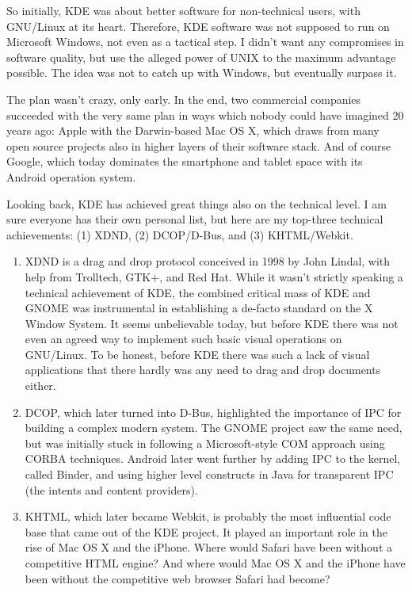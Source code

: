 So initially, KDE was about better software for non-technical users, with GNU/Linux at its heart.  Therefore, KDE software was not supposed to run on Microsoft Windows, not even as a tactical step. I didn't want any compromises in software quality, but use the alleged power of UNIX to the maximum advantage possible. The idea was not to catch up with Windows, but eventually surpass it.
 
The plan wasn't crazy, only early. In the end, two commercial companies succeeded with the very same plan in ways which nobody could have imagined 20 years ago: Apple with the Darwin-based Mac OS X, which draws from many open source projects also in higher layers of their software stack. And of course Google, which today dominates the smartphone and tablet space with its Android operation system.
 
Looking back, KDE has achieved great things also on the technical level. I am sure everyone has their own personal list, but here are my top-three technical achievements:  (1) XDND, (2) DCOP/D-Bus, and (3) KHTML/Webkit.
 
\begin{enumerate}
 \item XDND is a drag and drop protocol conceived in 1998 by John Lindal, with help from Trolltech, GTK+, and Red Hat. While it wasn't strictly speaking a technical achievement of KDE, the combined critical mass of KDE and GNOME was instrumental in establishing a de-facto standard on the X Window System. It seems unbelievable today, but before KDE there was not even an agreed way to implement such basic visual operations on GNU/Linux. To be honest, before KDE there was such a lack of visual applications that there hardly was any need to drag and drop documents either.
 \item DCOP, which later turned into D-Bus, highlighted the importance of IPC for building a complex modern system. The GNOME project saw the same need, but was initially stuck in following a Microsoft-style COM approach using CORBA techniques. Android later went further by adding IPC to the kernel, called Binder, and using higher level constructs in Java for transparent IPC (the intents and content providers).
 \item KHTML, which later became Webkit, is probably the most influential code base that came out of the KDE project. It played an important role in the rise of Mac OS X and the iPhone. Where would Safari have been without a competitive HTML engine? And where would Mac OS X and the iPhone have been without the competitive web browser Safari had become?
\end{enumerate}

